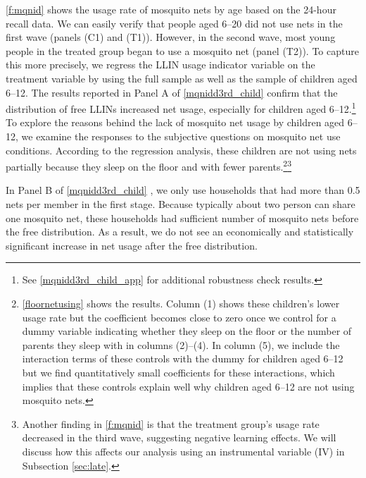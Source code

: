 \documentclass[fleqn,11pt]{article}
\begin{document}
\autoref{f:mqnid} shows the usage rate of
mosquito nets by age based on the 24-hour recall data. We can easily verify that people aged 6--20 did not use
nets in the first wave (panels (C1) and (T1)). However, in the second
wave, most young people in the treated group began to use a
mosquito net (panel (T2)). To capture this more
precisely, we regress the LLIN usage indicator variable on the treatment variable by using the full sample as well as the sample of children aged 6--12. The results reported in Panel A of \autoref{mqnidd3rd_child} confirm that the distribution of free LLINs increased net usage, especially for children aged 6--12.\footnote{See \autoref{mqnidd3rd_child_app} for additional robustness check results.} To explore the reasons behind the lack of mosquito net usage by children aged 6--12, we examine the responses to the subjective questions on mosquito net use conditions. According to the regression analysis, these children are not using nets partially because they sleep on the floor and with fewer parents.\footnote{\autoref{floornetusing} shows the results. Column (1) shows these children's lower usage rate but the coefficient becomes close to zero once we control for a dummy variable indicating whether they sleep on the floor or the number of parents they sleep with in columns (2)--(4). In column (5), we include the interaction terms of these controls with the dummy for children aged 6--12 but we find quantitatively small coefficients for these interactions, which implies that these controls explain well why children aged 6--12 are not using mosquito nets. }\footnote{Another finding in \autoref{f:mqnid} is that the treatment group's usage rate decreased in the third wave, suggesting negative learning effects. We will discuss how this affects our analysis using an instrumental variable (IV) in Subsection \ref{sec:late}.}

In Panel B of \autoref{mqnidd3rd_child} , we only use households that had more than 0.5 nets per member in the first stage. Because typically about two person can share one mosquito net, these households had sufficient number of mosquito nets before the free distribution. As a result, we do not see an economically and statistically significant increase in net usage after the free distribution. 

\end{document}
